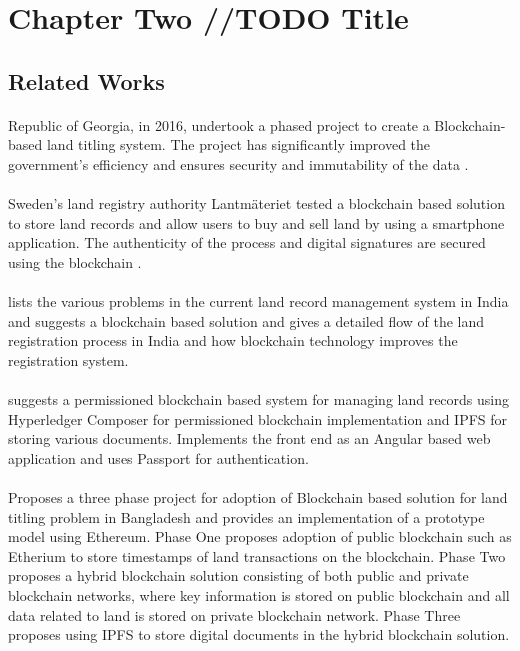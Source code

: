 \documentclass{article}
\begin{document}
\section{Chapter Two //TODO Title}
    \subsection{Related Works}
        \paragraph{}
        Republic of Georgia, in 2016, undertook a phased project to create a Blockchain-based land titling system. The project has significantly improved the government’s efficiency and ensures security and immutability of the data \cite{10.1162/inov_a_00276}.

        \paragraph{}
        Sweden’s land registry authority Lantmäteriet tested a blockchain based solution to store land records and allow users to buy and sell land by using a smartphone application. The authenticity of the process and digital signatures are secured using the blockchain \cite{sweden}.
        
        \paragraph{}
        \cite{THAKUR2020101940} lists the various problems in the current land record management system in India and suggests a blockchain based solution and gives a detailed flow of the land registration process in India and how blockchain technology improves the registration system.

        \paragraph{}
        \cite{8944471} suggests a permissioned blockchain based system for managing land records using Hyperledger Composer for permissioned blockchain implementation and IPFS for storing various documents. Implements the front end as an Angular based web application and uses Passport for authentication.

        \paragraph{}
        \cite{ALAM2020} Proposes a three phase project for adoption of Blockchain based solution for land titling problem in Bangladesh and provides an implementation of a prototype model using Ethereum. Phase One proposes adoption of public blockchain such as Etherium to store timestamps of land transactions on the blockchain. Phase Two proposes a hybrid blockchain solution consisting of both public and private blockchain networks, where key information is stored on public blockchain and all data related to land is stored on private blockchain network. Phase Three proposes using IPFS to store digital documents in the hybrid blockchain solution.



    \clearpage
    
    
\end{document}
